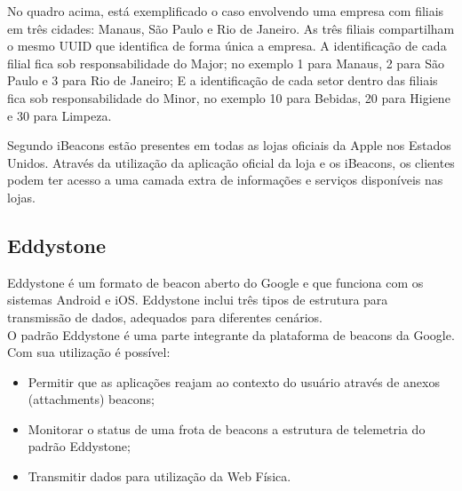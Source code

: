  No quadro acima, está exemplificado o caso envolvendo uma empresa com filiais em três cidades: Manaus, São Paulo e Rio de Janeiro. As três filiais compartilham o mesmo UUID que identifica de forma única a empresa. A identificação de cada filial fica sob responsabilidade do Major; no exemplo 1 para Manaus, 2 para São Paulo e 3 para Rio de Janeiro; E a identificação de cada setor dentro das filiais fica sob responsabilidade do Minor, no exemplo 10 para Bebidas, 20 para Higiene e 30 para Limpeza.
 
 \begin{figure}[h!]
 	\centering
\end{figure}
 
 \indent Segundo \cite{AppleInsider} iBeacons estão presentes em todas as lojas oficiais da Apple nos Estados Unidos. Através da utilização da aplicação oficial da loja e os iBeacons, os clientes podem ter acesso a uma camada extra de informações e serviços disponíveis nas lojas.
 
 \subsection{Eddystone}
 \label{sec:eddystone}
 
 Eddystone é um formato de beacon aberto do Google e que funciona com os sistemas Android e iOS. Eddystone inclui três tipos de estrutura para transmissão de dados, adequados para diferentes cenários. \cite{Google} \\
 \indent O padrão Eddystone é uma parte integrante da plataforma de beacons da Google. Com sua utilização é possível:
 
 \begin{itemize}
 	\item Permitir que as aplicações reajam ao contexto do usuário através de anexos (attachments) beacons;
 	\item Monitorar o status de uma frota de beacons a estrutura de telemetria do padrão Eddystone;
 	\item Transmitir dados para utilização da Web Física.
 \end{itemize}
 
